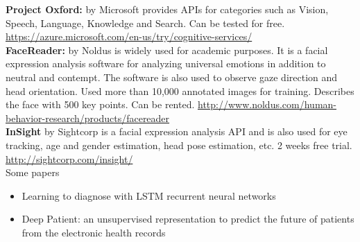\textbf{Project Oxford:} by Microsoft provides APIs for categories such as Vision, Speech, Language, Knowledge and Search. Can be tested for free.
\url{https://azure.microsoft.com/en-us/try/cognitive-services/}\\

\textbf{FaceReader:} by Noldus is widely used for academic purposes. It is a facial expression analysis software for analyzing universal emotions in addition to neutral and contempt. The software is also used to observe gaze direction and head orientation. Used more than 10,000 annotated images for training. Describes the face with 500 key points. Can be rented. 
\url{http://www.noldus.com/human-behavior-research/products/facereader}\\

\textbf{InSight} by Sightcorp is a facial expression analysis API and is also used for eye tracking, age and gender estimation, head pose estimation, etc. 2 weeks free trial.
\url{http://sightcorp.com/insight/}\\

Some papers

\begin{itemize}
    \item Learning to diagnose with LSTM recurrent neural networks
    \item Deep Patient: an unsupervised representation to predict the future of patients from the electronic health records
\end{itemize}



